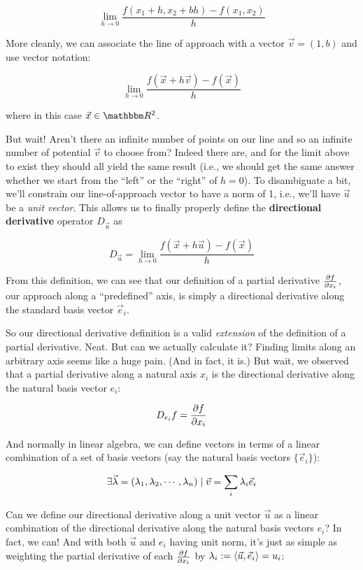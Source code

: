 \documentclass[../main/main.tex]{subfiles}
\begin{document}
\[\lim_{h \to 0} \frac{f(x_1 + h, x_2 + bh) - f(x_1,x_2)}{h} \]

More cleanly, we can associate the line of approach with a vector
\(\vec{v} = (1,b)\) and use vector notation:

\[\lim_{h \to 0} \frac{f(\vec{x} + h\vec{v}) - f(\vec{x})}{h} \]

where in this case \(\vec{x} \in \domain{R}^2\).\par
But wait! Aren't there an infinite number of points on our line
and so an infinite number of potential \(\vec{v}\) to choose
from? Indeed there are, and for the limit above to exist
they should all yield the same result (i.e., 
we should get the same answer whether we start
from the ``left'' or the ``right'' of \(h = 0\)). To disambiguate
a bit, we'll constrain our line-of-approach vector to have
a norm of 1, i.e., 
we'll have \(\vec{u}\) be a \emph{unit vector}.
This allows us to finally properly define the 
\textbf{directional derivative} operator \(D_{\vec{u}}\)
as

\[D_{\vec{u}} = \lim_{h \to 0} \frac{f(\vec{x} + h\vec{u}) - f(\vec{x})}{h} \]

From this definition, we can see that our definition of a
partial derivative \(\pdv{f}{x_i}\),
our approach along a ``predefined'' axis, 
is simply a directional
derivative along the standard basis vector \(\vec{e}_i\).\par

So our directional derivative definition is a valid 
\emph{extension}
of the definition of a partial derivative. Neat. 
But can we actually calculate it? Finding limits along an
arbitrary axis seems like a huge pain. (And in fact,
it is.) But wait, we observed that
a partial derivative along a natural axis \(x_i\)
is the directional derivative 
along the natural basis vector \(e_i\):

\[ D_{e_i}f = \pdv{f}{x_i} \]

And normally in linear algebra, we can define vectors
in terms of a linear combination of 
a set of basis vectors (say the natural basis
vectors \(\{\vec{e}_i\}\)):

\[\exists \vec{\lambda} = \left(\lambda_1, \lambda_2, \cdots, \lambda_n\right) \mid \vec{v} = \sum_i \lambda_i \vec{e}_i \]

Can we define our directional derivative along a unit vector
\(\vec{u}\) as a linear combination of 
the directional derivative along
the natural basis vectors \(e_i\)? In fact, we can!
And with both \(\vec{u}\) and \(e_i\) having unit norm, 
it's just as simple
as weighting the partial derivative of each \(\pdv{f}{x_i}\)
by \(\lambda_i := \left<\vec{u},\vec{e}_i\right> = u_i\):
\end{document}
